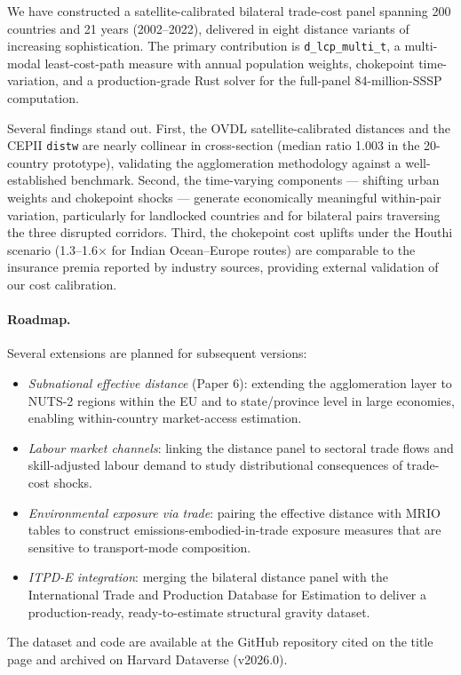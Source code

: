 \documentclass[11pt, a4paper]{article}
\begin{document}
We have constructed a satellite-calibrated bilateral trade-cost panel spanning
200 countries and 21 years (2002--2022), delivered in eight distance variants
of increasing sophistication.  The primary contribution is \texttt{d\_lcp\_multi\_t},
a multi-modal least-cost-path measure with annual population weights,
chokepoint time-variation, and a production-grade Rust solver for the
full-panel 84-million-SSSP computation.

Several findings stand out.  First, the OVDL satellite-calibrated distances
and the CEPII \texttt{distw} are nearly collinear in cross-section (median
ratio 1.003 in the 20-country prototype), validating the agglomeration
methodology against a well-established benchmark.  Second, the time-varying
components --- shifting urban weights and chokepoint shocks --- generate
economically meaningful within-pair variation, particularly for landlocked
countries and for bilateral pairs traversing the three disrupted corridors.
Third, the chokepoint cost uplifts under the Houthi scenario (1.3--1.6$\times$
for Indian Ocean--Europe routes) are comparable to the insurance premia reported
by industry sources, providing external validation of our cost calibration.

\paragraph{Roadmap.}
Several extensions are planned for subsequent versions:
\begin{itemize}
  \item \emph{Subnational effective distance} (Paper 6): extending the
    agglomeration layer to NUTS-2 regions within the EU and to state/province
    level in large economies, enabling within-country market-access estimation.
  \item \emph{Labour market channels}: linking the distance panel to sectoral
    trade flows and skill-adjusted labour demand to study distributional
    consequences of trade-cost shocks.
  \item \emph{Environmental exposure via trade}: pairing the effective
    distance with MRIO tables to construct emissions-embodied-in-trade
    exposure measures that are sensitive to transport-mode composition.
  \item \emph{ITPD-E integration}: merging the bilateral distance panel with
    the International Trade and Production Database for Estimation
    \citep{borchert_larch_shikher_yotov_2022} to deliver a
    production-ready, ready-to-estimate structural gravity dataset.
\end{itemize}

The dataset and code are available at the GitHub repository cited on the
title page and archived on Harvard Dataverse (v2026.0).


\end{document}
